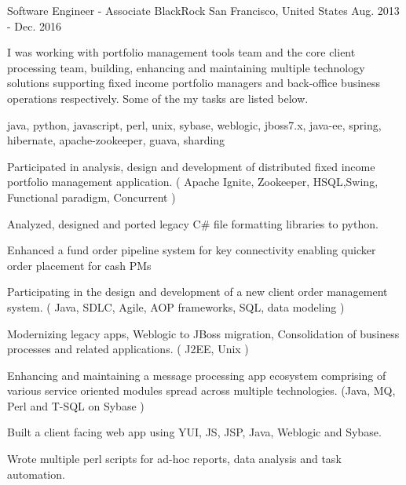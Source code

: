 \cventry
    {Software Engineer - Associate} %
    {BlackRock} %
    {San Francisco, United States} %
    {Aug. 2013 - Dec. 2016} %
    {
    \begin{cvitems} %
        I was working with portfolio management tools team and the core client processing team, building, enhancing and maintaining multiple technology solutions
    supporting fixed income portfolio managers and back-office business operations respectively. Some of the my tasks are listed below.
        \item { java, python, javascript, perl, unix, sybase, weblogic, jboss7.x, java-ee, spring, hibernate, apache-zookeeper, guava, sharding}
        \item { Participated in analysis, design and development of distributed fixed income portfolio management application. ( Apache Ignite, Zookeeper, HSQL,Swing, Functional paradigm, Concurrent )}
        \item { Analyzed, designed and ported legacy C\# file formatting libraries to python.}
        \item { Enhanced a fund order pipeline system for key connectivity enabling quicker order placement for cash PMs}
        \item { Participating in the design and development of a new client order management system. ( Java, SDLC, Agile, AOP frameworks, SQL, data modeling )}
        \item { Modernizing legacy apps, Weblogic to JBoss migration, Consolidation of business processes and related applications. ( J2EE, Unix )}
        \item { Enhancing and maintaining a message processing app ecosystem comprising of various service oriented modules spread across multiple technologies. (Java, MQ, Perl and T-SQL on Sybase )}
        \item { Built a client facing web app using YUI, JS, JSP, Java, Weblogic and Sybase.}
        \item { Wrote multiple perl scripts for ad-hoc reports, data analysis and task automation.}
    \end{cvitems}
    }